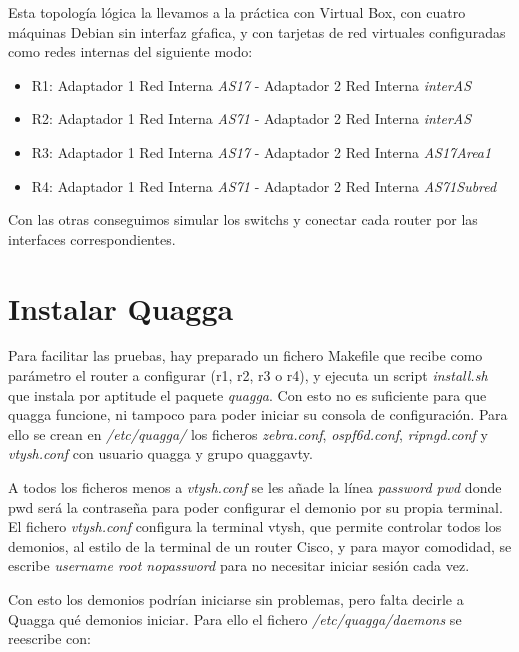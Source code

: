 \documentclass{article}
\begin{document}
\hfill

Esta topología lógica la llevamos a la práctica con Virtual Box, con cuatro máquinas Debian sin interfaz gŕafica, y con tarjetas de red virtuales configuradas como redes internas del siguiente modo:

\begin{itemize}

	\item R1: Adaptador 1 Red Interna \textit{AS17} - Adaptador 2 Red Interna \textit{interAS}

	\item R2: Adaptador 1 Red Interna \textit{AS71} - Adaptador 2 Red Interna \textit{interAS}

	\item R3: Adaptador 1 Red Interna \textit{AS17} - Adaptador 2 Red Interna \textit{AS17Area1}

	\item R4: Adaptador 1 Red Interna \textit{AS71} - Adaptador 2 Red Interna \textit{AS71Subred}

\end{itemize}

Con las otras conseguimos simular los switchs y conectar cada router por las interfaces correspondientes.


\section{Instalar Quagga}

Para facilitar las pruebas, hay preparado un fichero Makefile que recibe como parámetro el router a configurar (r1, r2, r3 o r4), y ejecuta un script \textit{install.sh} que instala por aptitude el paquete \textit{quagga}.
 Con esto no es suficiente para que quagga funcione, ni tampoco para poder iniciar su consola de configuración. Para ello se crean en \textit{/etc/quagga/}
 los ficheros \textit{zebra.conf}, \textit{ospf6d.conf}, \textit{ripngd.conf} y \textit{vtysh.conf} con usuario quagga y grupo quaggavty.

 A todos los ficheros menos a \textit{vtysh.conf} se les añade la línea \textit{password pwd} donde pwd será la contraseña para poder configurar el demonio por su propia terminal. El fichero \textit{vtysh.conf} configura la terminal vtysh, que permite controlar todos los demonios, al estilo de la terminal de un router Cisco, y para mayor comodidad, se escribe \textit{username root nopassword} para no necesitar iniciar sesión cada vez.

 Con esto los demonios podrían iniciarse sin problemas, pero falta decirle a Quagga qué demonios iniciar. Para ello el fichero \textit{/etc/quagga/daemons} se reescribe con:
\end{document}
